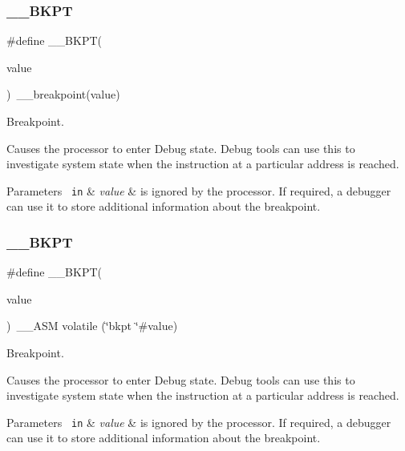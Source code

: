 \subsubsection{\texorpdfstring{\_\_BKPT}{\_\_BKPT}\hspace{0.1cm}{\footnotesize\ttfamily [1/3]}}
{\footnotesize\ttfamily \#define \+\_\+\+\_\+\+B\+K\+PT(\begin{DoxyParamCaption}\item[{}]{value }\end{DoxyParamCaption})~\+\_\+\+\_\+breakpoint(value)}



Breakpoint. 

Causes the processor to enter Debug state. Debug tools can use this to investigate system state when the instruction at a particular address is reached. 
\begin{DoxyParams}[1]{Parameters}
\mbox{\texttt{ in}}  & {\em value} & is ignored by the processor. If required, a debugger can use it to store additional information about the breakpoint. \\
\hline
\end{DoxyParams}
\mbox{\label{group___c_m_s_i_s___core___instruction_interface_ga15ea6bd3c507d3e81c3b3a1258e46397}} 
\subsubsection{\texorpdfstring{\_\_BKPT}{\_\_BKPT}\hspace{0.1cm}{\footnotesize\ttfamily [2/3]}}
{\footnotesize\ttfamily \#define \+\_\+\+\_\+\+B\+K\+PT(\begin{DoxyParamCaption}\item[{}]{value }\end{DoxyParamCaption})~\+\_\+\+\_\+\+A\+SM volatile (\char`\"{}bkpt \char`\"{}\#value)}



Breakpoint. 

Causes the processor to enter Debug state. Debug tools can use this to investigate system state when the instruction at a particular address is reached. 
\begin{DoxyParams}[1]{Parameters}
\mbox{\texttt{ in}}  & {\em value} & is ignored by the processor. If required, a debugger can use it to store additional information about the breakpoint. \\
\hline
\end{DoxyParams}
\mbox{\label{group___c_m_s_i_s___core___instruction_interface_ga15ea6bd3c507d3e81c3b3a1258e46397}} 
